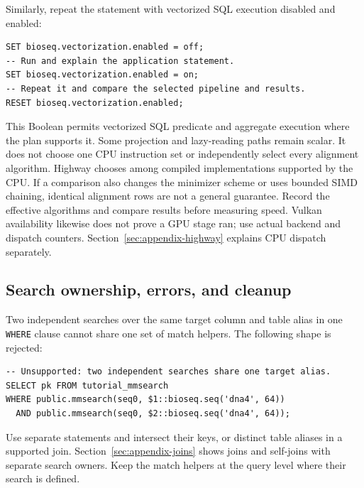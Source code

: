 Similarly, repeat the statement with vectorized SQL execution disabled and
enabled:

\par\noindent\begin{minipage}{\linewidth}
\begin{lstlisting}[style=bioseq-appendix-sql]
SET bioseq.vectorization.enabled = off;
-- Run and explain the application statement.
SET bioseq.vectorization.enabled = on;
-- Repeat it and compare the selected pipeline and results.
RESET bioseq.vectorization.enabled;
\end{lstlisting}
\end{minipage}

This Boolean permits vectorized SQL predicate and aggregate execution where
the plan supports it. Some projection and lazy-reading paths remain scalar.
It does not choose one CPU instruction set or independently select every
alignment algorithm. Highway chooses among compiled implementations
supported by the CPU. If a comparison
also changes the minimizer scheme or uses bounded SIMD chaining, identical
alignment rows are not a general guarantee. Record the effective algorithms
and compare results before measuring speed. Vulkan availability likewise does
not prove a GPU stage ran; use actual backend and dispatch counters.
Section~\ref{sec:appendix-highway} explains CPU dispatch separately.

\subsection{Search ownership, errors, and cleanup}

Two independent searches over the same target column and table alias in one
\texttt{WHERE} clause cannot share one set of match helpers. The following
shape is rejected:

\par\noindent\begin{minipage}{\linewidth}
\begin{lstlisting}[style=bioseq-appendix-sql]
-- Unsupported: two independent searches share one target alias.
SELECT pk FROM tutorial_mmsearch
WHERE public.mmsearch(seq0, $1::bioseq.seq('dna4', 64))
  AND public.mmsearch(seq0, $2::bioseq.seq('dna4', 64));
\end{lstlisting}
\end{minipage}

Use separate statements and intersect their keys, or distinct table aliases
in a supported join. Section~\ref{sec:appendix-joins} shows joins and self-joins with
separate search owners. Keep the match helpers at the query level where their
search is defined.


